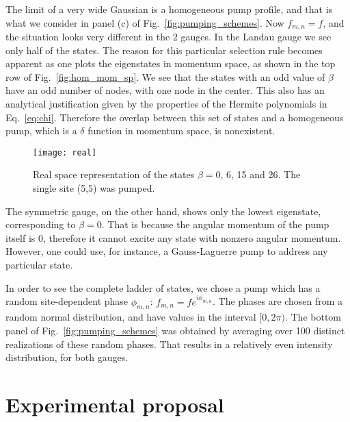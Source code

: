 \documentclass[twocolumn, 10pt, aps, superscriptaddress, floatfix, showpacs, prb, citeautoscript]{revtex4-1}
\newcommand{\co}[2]{#2}
\renewcommand{\paragraph}{\co}
\begin{document}
\paragraph{Homogeneous spectrum can be understood using a parity argument in momentum space.}
The limit of a very wide Gaussian is a homogeneous pump profile, and
that is what we consider in panel (c) of
Fig.~\ref{fig:pumping_schemes}. Now $f_{m,n} = f$, and the situation
looks very different in the 2 gauges.  In the Landau gauge we see only
half of the states. The reason for this particular selection rule
becomes apparent as one plots the eigenstates in momentum space, as
shown in the top row of Fig.~\ref{fig:hom_mom_sp}. We see that the
states with an odd value of $\beta$ have an odd number of nodes, with
one node in the center. This also has an analytical justification
given by the properties of the Hermite polynomials in
Eq.~\eqref{eq:chi}. Therefore the overlap between this set of states
and a homogeneous pump, which is a $\delta$ function in momentum
space, is nonexistent. 
%
\begin{figure}[htb]
  \centering
  \texttt{[image: real]}
  \caption{Real space representation of the states $\beta=0$, 6, 15
    and 26. The single site (5,5) was pumped.}
  \label{fig:delta_real_sp}
\end{figure}

The symmetric gauge, on the other hand, shows only the lowest
eigenstate, corresponding to $\beta=0$. That is because the angular
momentum of the pump itself is 0, therefore it cannot excite any state
with nonzero angular momentum. However, one could use, for instance, a
Gauss-Laguerre pump to address any particular state.

\paragraph{One must use a random phase in order to see all the states.}
In order to see the complete ladder of states, we chose a pump which
has a random site-dependent phase $\phi_{m,n}$:
$f_{m,n}=fe^{i\phi_{m,n}}$.  The phases are chosen from a random
normal distribution, and have values in the interval $[0,2\pi)$. The
bottom panel of Fig.~\ref{fig:pumping_schemes} was obtained by
averaging over 100 distinct realizations of these random phases. That
results in a relatively even intensity distribution, for both gauges.


\section{Experimental proposal}
\label{sec:experiment}
\end{document}
